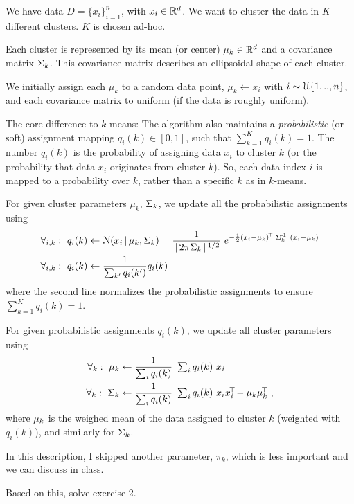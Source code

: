 \begin{items}
\item We have data $D=\{x_i\}_{i=1}^n$, with $x_i\in\RRR^d$. We want to cluster the data in $K$ different clusters. $K$ is chosen ad-hoc.
\item Each cluster is represented by its mean (or center) $\mu_k\in\RRR^d$ and a covariance matrix $\S_k$. This covariance matrix describes an ellipsoidal shape of each cluster.
\item We initially assign each $\mu_k$ to a random data point, $\mu_k \gets x_i$ with $i \sim\UU\{1,..,n\}$, and each covariance matrix to uniform (if the data is roughly uniform).
\item The core difference to $k$-means: The algorithm also maintains a \emph{probabilistic} (or soft) assignment mapping $q_i(k) \in [0,1]$, such that $\sum_{k=1}^K q_i(k) = 1$. The number $q_i(k)$ is the probability of assigning data $x_i$ to cluster $k$ (or the probability that data $x_i$ originates from cluster $k$). So, each data index $i$ is mapped to a probability over $k$, rather than a specific $k$ as in $k$-means.
\item For given cluster parameters $\mu_k$, $\S_k$, we update all the probabilistic assignments using
\begin{align*}
\forall_{i,k}:~ q_i(k) &\gets \NN(x_i \| \m_k, \S_k) = \frac{1}{\|2\pi \S_k\|^{1/2}}~ e^{-\half (x_i-\m_k)^\T~ \S_k^\1~ (x_i-\m_k)} \\
\forall_{i,k}:~ q_i(k) &\gets \frac{1}{\sum_{k'} q_i(k')} q_i(k)
\end{align*}
where the second line normalizes the probabilistic assignments to ensure $\sum_{k=1}^K q_i(k) = 1$.
\item For given probabilistic assignments $q_i(k)$, we update all cluster parameters using
\begin{align*}
\forall_k:~ \m_k &\gets \frac{1}{\textstyle\sum_i q_i(k)}~ \textstyle\sum_i q_i(k)~ x_i\\
\forall_k:~ \S_k &\gets \frac{1}{\textstyle\sum_i q_i(k)}~ \textstyle\sum_i q_i(k)~ x_ix_i^\T - \m_k\m_k^\T ~,
\end{align*}
where $\m_k$ is the weighed mean of the data assigned to cluster $k$ (weighted with $q_i(k)$), and similarly for $\S_k$.
\item In this description, I skipped another parameter, $\pi_k$, which is less important and we can discuss in class.
\end{items}

Based on this, solve exercise 2.

